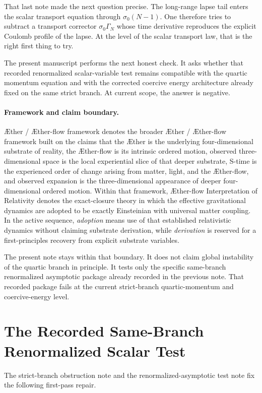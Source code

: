 \documentclass[11pt]{article}
\newcommand{\Aether}{\AE{}ther}
\newcommand{\Aflow}{\AE{}ther-flow}
\newcommand{\TheoryName}{\Aflow{} Interpretation of Relativity}
\newcommand{\TheoryProgram}{\Aether{} / \Aflow{} framework}
\begin{document}
That last note made the next question precise. The long-range lapse tail enters the scalar transport equation through \(\sigma_0(N-1)\). One therefore tries to subtract a transport corrector \(\sigma_0\Gamma_N\) whose time derivative reproduces the explicit Coulomb profile of the lapse. At the level of the scalar transport law, that is the right first thing to try.

The present manuscript performs the next honest check. It asks whether that recorded renormalized scalar-variable test remains compatible with the quartic momentum equation and with the corrected coercive energy architecture already fixed on the same strict branch. At current scope, the answer is negative.

\paragraph{Framework and claim boundary.}
\TheoryProgram{} denotes the broader \Aether{} / \Aflow{} framework built on the claims that the \Aether{} is the underlying four-dimensional substrate of reality, the \Aflow{} is its intrinsic ordered motion, observed three-dimensional space is the local experiential slice of that deeper substrate, S-time is the experienced order of change arising from matter, light, and the \Aflow{}, and observed expansion is the three-dimensional appearance of deeper four-dimensional ordered motion. Within that framework, \TheoryName{} denotes the exact-closure theory in which the effective gravitational dynamics are adopted to be exactly Einsteinian with universal matter coupling. In the active sequence, \emph{adoption} means use of that established relativistic dynamics without claiming substrate derivation, while \emph{derivation} is reserved for a first-principles recovery from explicit substrate variables.

The present note stays within that boundary. It does not claim global instability of the quartic branch in principle. It tests only the specific same-branch renormalized asymptotic package already recorded in the previous note. That recorded package fails at the current strict-branch quartic-momentum and coercive-energy level.

\section{The Recorded Same-Branch Renormalized Scalar Test}

The strict-branch obstruction note and the renormalized-asymptotic test note fix the following first-pass repair.
\end{document}
